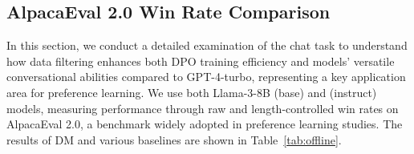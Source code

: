 {\subsection{AlpacaEval 2.0 Win Rate Comparison}
\label{exp:alpaca}
In this section, we conduct a detailed examination of the chat task to understand how data filtering enhances both DPO training efficiency and models' versatile conversational abilities compared to GPT-4-turbo, representing a key application area for preference learning. We use both Llama-3-8B (base) and (instruct) models, measuring performance through raw and length-controlled win rates on AlpacaEval 2.0, a benchmark widely adopted in preference learning studies. The results of DM and various baselines are shown in Table~\ref{tab:offline}.

\begin{table}[t]
    \centering
    \setlength{\abovecaptionskip}{0.1cm}
    \setlength{\belowcaptionskip}{0cm}
    \caption{Iterative DPO: AlpacaEval 2.0 benchmark results across three iterations of DPO training with \textbf{UltraFeedback} prompts.}
    \label{tab:onine}
    \vspace{-10pt}
\end{table}

}
